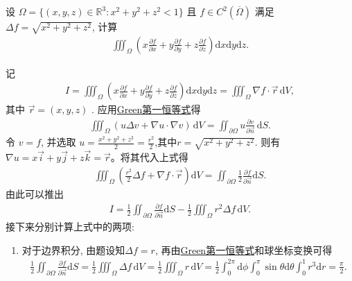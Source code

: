 \documentclass[../../main.tex]{subfiles}%
\begin{document}
\begin{example}
设 \(\Omega = \{(x,y,z) \in \mathbb{R}^3 : x^2+y^2+z^2 < 1\}\) 且 \(f \in C^2 (\overline{\Omega})\) 满足 \(\Delta f = \sqrt{x^2+y^2+z^2}\), 计算
\begin{align*}
\iiint_{\Omega} \left( x \frac{\partial f}{\partial x} + y \frac{\partial f}{\partial y} + z \frac{\partial f}{\partial z} \right) \mathrm{d}x\mathrm{d}y\mathrm{d}z.
\end{align*}
\end{example}
\begin{solution}
记
\begin{align*}
I = \iiint_{\Omega} \left( x \frac{\partial f}{\partial x} + y \frac{\partial f}{\partial y} + z \frac{\partial f}{\partial z} \right) \mathrm{d}x\mathrm{d}y\mathrm{d}z = \iiint_{\Omega} \nabla f \cdot \vec{r} \, \mathrm{d}V,
\end{align*}
其中 \(\vec{r} = (x,y,z)\) .
应用\hyperref[theorem:Green恒等式]{Green第一恒等式}得
\begin{align*}
\iiint_{\Omega} (u \Delta v + \nabla u \cdot \nabla v) \, \mathrm{d}V = \iint_{\partial \Omega} u \frac{\partial v}{\partial \vec{n}} \, \mathrm{d}S.
\end{align*}
令 \(v = f\), 并选取 \(u = \frac{x^2+y^2+z^2}{2} = \frac{r^2}{2}\),其中$r=\sqrt{x^2+y^2+z^2}$. 则有 \(\nabla u = x\vec{i} + y\vec{j} + z\vec{k} = \vec{r}\)。将其代入上式得
\begin{align*}
\iiint_{\Omega} \left( \frac{r^2}{2} \Delta f + \nabla f \cdot \vec{r} \right) \mathrm{d}V = \iint_{\partial \Omega} \frac{1}{2} \frac{\partial f}{\partial \vec{n}} \mathrm{d}S.
\end{align*}
由此可以推出
\begin{align*}
I = \frac{1}{2} \iint_{\partial \Omega} \frac{\partial f}{\partial \vec{n}} \mathrm{d}S - \frac{1}{2} \iiint_{\Omega} r^2 \Delta f \, \mathrm{d}V.
\end{align*}
接下来分别计算上式中的两项:
\begin{enumerate}[(1)]
\item 对于边界积分, 
由题设知\(\Delta f = r\), 再由\hyperref[theorem:Green恒等式]{Green第一恒等式}和球坐标变换可得
\begin{align*}
\frac{1}{2}\iint_{\partial \Omega}{\frac{\partial f}{\partial \vec{n}}\mathrm{d}S}=\frac{1}{2}\iiint_{\Omega}{\Delta f\,\mathrm{d}V}=\frac{1}{2}\iiint_{\Omega}{r\,\mathrm{d}V}=\frac{1}{2}\int_0^{2\pi}{\mathrm{d}\phi \int_0^{\pi}{\sin \theta \mathrm{d}\theta \int_0^1{r^3\mathrm{d}r}}}=\frac{\pi}{2}.
\end{align*}


\end{enumerate}
\end{solution}
\end{document}
